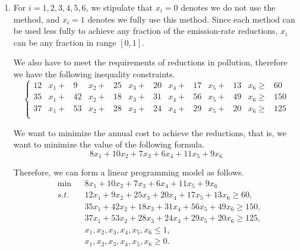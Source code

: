 \documentclass[12pt,a4paper]{article}
\makeatletter
\newtheorem*{solution}{Solution}
\theoremstyle{definition}
\renewenvironment{solution}[1][Solution] {\par\pushQED{\qed}\normalfont\topsep6\p@\@plus6\p@\relax\trivlist\item[\hskip\labelsep\bfseries#1\@addpunct{.}]\ignorespaces}{\popQED\endtrivlist\@endpefalse} \makeatother
\makeatother
\begin{document}
\begin{enumerate}
\begin{solution}
\begin{enumerate}
        For $i = 1,2,3,4,5,6$, we stipulate that $x_i = 0$ denotes we do not use the method, and $x_i = 1$ denotes we fully use this method. Since each method can be used less fully to achieve any fraction of the emission-rate reductions, $x_i$ can be any fraction in range $[0,1]$.

        We also have to meet the requirements of reductions in pollution, therefore we have the following inequality constraints.
        \begin{displaymath}
        \left\{
        \begin{aligned}
        12 &x_1 + & 9 &x_2 + & 25 &x_3 + & 20 &x_4 + & 17 &x_5 + & 13 &x_6 \geq& 60 \\
 		35 &x_1 + & 42 &x_2 + & 18 &x_3 + & 31 &x_4 + & 56 &x_5 + & 49 &x_6 \geq& 150 \\
 		37 &x_1 + & 53 &x_2 + & 28 &x_3 + & 24 &x_4 + & 29 &x_5 + & 20 &x_6 \geq& 125 \\
        \end{aligned}
        \right.
        \end{displaymath}

        We want to minimize the annual cost to achieve the reductions, that is, we want to minimize the value of the following formula.
        \begin{displaymath}
        8x_1 + 10x_2 + 7x_3 + 6x_4 + 11x_5 + 9x_6
        \end{displaymath}

        Therefore, we can form a linear programming model as follows.
        \begin{displaymath}
        \begin{aligned}
        & \min && 8  x_1 + 10 x_2 + 7 x_3 + 6 x_4 + 11 x_5 + 9 x_6 \\
        & s.t. && 12 x_1 + 9 x_2 + 25 x_3 + 20 x_4 + 17 x_5 + 13 x_6 \geq 60, \\
 		&      && 35 x_1 + 42 x_2 + 18 x_3 + 31 x_4 + 56 x_5 + 49 x_6 \geq 150, \\
 		&      && 37 x_1 + 53 x_2 + 28 x_3 + 24 x_4 + 29 x_5 + 20 x_6 \geq 125, \\
        &      && x_1, x_2, x_3, x_4, x_5, x_6                        \leq 1, \\
        &      && x_1, x_2, x_3, x_4, x_5, x_6                        \geq 0. \\
        \end{aligned}
        \end{displaymath}


\end{enumerate}
\end{solution}
\end{enumerate}
\end{document}
